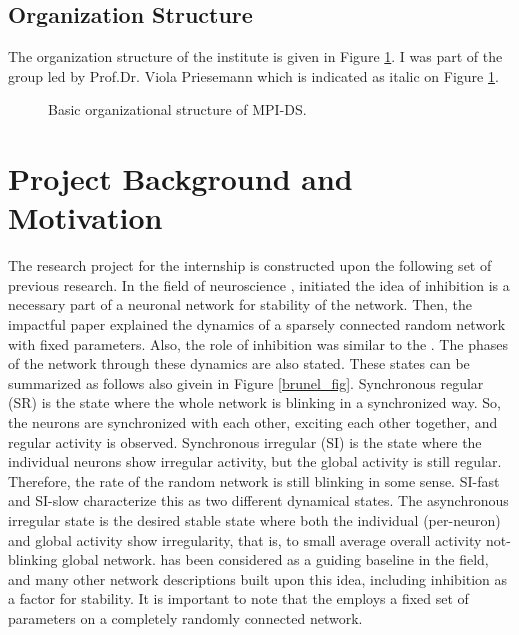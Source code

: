 \documentclass[a4paper,12pt]{article}
\begin{document}
\subsection{Organization Structure}
The organization structure of the institute is given in Figure \ref{organization}. I was part of the group led by Prof.Dr. Viola Priesemann which is indicated as italic on Figure \ref{organization}.

\begin{figure}[H] 
    \caption{Basic organizational structure of MPI-DS.}
    \label{organization}
\end{figure}

\section{Project Background and Motivation}
The research project for the internship is constructed upon the following set of previous research. In the field of neuroscience \cite{CHAOS}, initiated the idea of inhibition is a necessary part of a neuronal network for stability of the network. Then, the impactful paper \cite{brunel} explained the dynamics of a sparsely connected random network with fixed parameters. Also, the role of inhibition was similar to the \cite{CHAOS}. The phases of the network through these dynamics are also stated. These states can be summarized as follows also givein in Figure \ref{brunel_fig}. Synchronous regular (SR) is the state where the whole network is blinking in a synchronized way. So, the neurons are synchronized with each other, exciting each other together, and regular activity is observed. Synchronous irregular (SI) is the state where the individual neurons show irregular activity, but the global activity is still regular. Therefore, the rate of the random network is still blinking in some sense. SI-fast and SI-slow characterize this as two different dynamical states. The asynchronous irregular state is the desired stable state where both the individual (per-neuron) and global activity show irregularity, that is, to small average overall activity not-blinking global network. \cite{brunel} has been considered as a guiding baseline in the field, and many other network descriptions built upon this idea, including inhibition as a factor for stability. It is important to note that the \cite{brunel} employs a fixed set of parameters on a completely randomly connected network.
\end{document}
